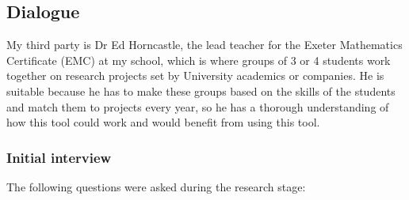 \documentclass{article}
\begin{document}
\subsection{Dialogue}
My third party is Dr Ed Horncastle, the lead teacher for the Exeter Mathematics Certificate (EMC) at 
my school, which is where groups of 3 or 4 students work together on research projects set by 
University academics or companies. He is suitable because he has to make these groups based on the 
skills of the students and match them to projects every year, so he has a thorough understanding of 
how this tool could work and would benefit from using this tool.
\subsubsection{Initial interview}
The following questions were asked during the research stage:
\end{document}
